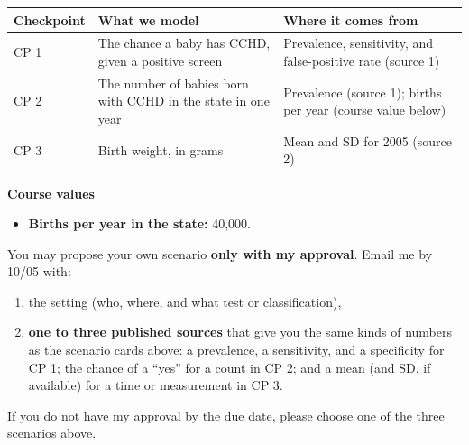 \documentclass[
  letterpaper,
  DIV=11,
  numbers=noendperiod]{scrartcl}
\newcounter{none} %
\providecommand{\tightlist}{%
  \setlength{\itemsep}{0pt}\setlength{\parskip}{0pt}}
\begin{document}
{\def\LTcaptype{none} %
\begin{longtable}[]{@{}
  >{\raggedright\arraybackslash}p{}
  >{\raggedright\arraybackslash}p{}
  >{\raggedright\arraybackslash}p{}@{}}
\toprule\noalign{}
\begin{minipage}[b]{\linewidth}\raggedright
Checkpoint
\end{minipage} & \begin{minipage}[b]{\linewidth}\raggedright
What we model
\end{minipage} & \begin{minipage}[b]{\linewidth}\raggedright
Where it comes from
\end{minipage} \\
\midrule\noalign{}
\endhead
\bottomrule\noalign{}
\endlastfoot
CP 1 & The chance a baby has CCHD, given a positive screen & Prevalence,
sensitivity, and false-positive rate (source 1) \\
CP 2 & The number of babies born with CCHD in the state in one year &
Prevalence (source 1); births per year (course value below) \\
CP 3 & Birth weight, in grams & Mean and SD for 2005 (source 2) \\
\end{longtable}
}

\textbf{Course values}

\begin{itemize}
\tightlist
\item
  \textbf{Births per year in the state:} 40,000.
\end{itemize}

\begin{tcolorbox}[enhanced jigsaw, arc=.35mm, bottomrule=.15mm, bottomtitle=1mm, breakable, colback=white, colbacktitle=quarto-callout-tip-color!10!white, colframe=quarto-callout-tip-color-frame, coltitle=black, left=2mm, leftrule=.75mm, opacityback=0, opacitybacktitle=0.6, rightrule=.15mm, title=\textcolor{quarto-callout-tip-color}{\faLightbulb}\hspace{0.5em}{Want to propose your own scenario?}, titlerule=0mm, toprule=.15mm, toptitle=1mm]

You may propose your own scenario \textbf{only with my approval}. Email
me by 10/05 with:

\begin{enumerate}
\def\labelenumi{\arabic{enumi}.}
\tightlist
\item
  the setting (who, where, and what test or classification),
\item
  \textbf{one to three published sources} that give you the same kinds
  of numbers as the scenario cards above: a prevalence, a sensitivity,
  and a specificity for CP 1; the chance of a ``yes'' for a count in CP
  2; and a mean (and SD, if available) for a time or measurement in CP
  3.
\end{enumerate}

If you do not have my approval by the due date, please choose one of the
three scenarios above.

\end{tcolorbox}
\end{document}

